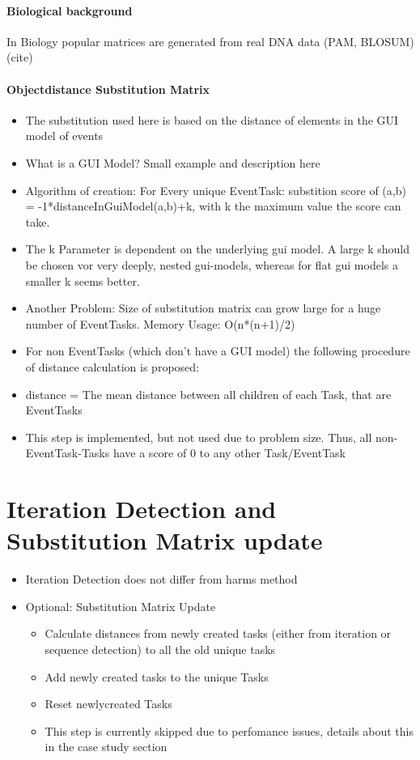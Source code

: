 	\paragraph{Biological background}
	In Biology popular matrices are generated from real DNA data (PAM, BLOSUM) (cite)
	\paragraph{Objectdistance Substitution Matrix}
	\begin{itemize}
		\item The substitution used here is based on the distance of elements in the GUI model of events
		\item What is a GUI Model? Small example and description here
		\item Algorithm of creation: For Every unique EventTask: substition score of (a,b) = -1*distanceInGuiModel(a,b)+k, with k the maximum value the score can take.
		\item The k Parameter is dependent on the underlying gui model. A large k should be chosen vor very deeply, nested gui-models, whereas for flat gui models a smaller k seems better. 
		\item Another Problem: Size of substitution matrix can grow large for a huge number of EventTasks. Memory Usage: O(n*(n+1)/2) 
		\item For non EventTasks (which don't have a GUI model) the following procedure of distance calculation is proposed:
		\item distance = The mean distance between all children of each Task, that are EventTasks
		\item This step is implemented, but not used due to problem size. Thus, all non-EventTask-Tasks have a score of 0 to any other Task/EventTask
	\end{itemize}

\section{Iteration Detection and Substitution Matrix update}
\begin{itemize}
	\item Iteration Detection does not differ from harms method
	\item Optional: Substitution Matrix Update 
	\begin{itemize}
		\item Calculate distances from newly created tasks (either from iteration or sequence detection) to all the old unique tasks
		\item Add newly created tasks to the unique Tasks
		\item Reset newlycreated Tasks
		\item This step is currently skipped due to perfomance issues, details about this in the case study section
	\end{itemize}
\end{itemize}


